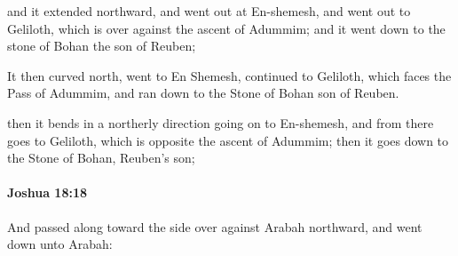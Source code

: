 			\begin{versebox}
					\item[BHS] 
					\item[ASV] and it extended northward, and went out at En-shemesh, and went out to Geliloth, which is over against the ascent of Adummim; and it went down to the stone of Bohan the son of Reuben;
					\item[NIV] It then curved north, went to En Shemesh, continued to Geliloth, which faces the Pass of Adummim, and ran down to the Stone of Bohan son of Reuben.
					\item[NRSV] then it bends in a northerly direction going on to En-shemesh, and from there goes to Geliloth, which is opposite the ascent of Adummim; then it goes down to the Stone of Bohan, Reuben’s son;
			\end{versebox}

		\paragraph{Joshua 18:18} %
			\label{JOSHUA-18-18}

			And passed along toward the side over against Arabah northward, and went down unto Arabah:

